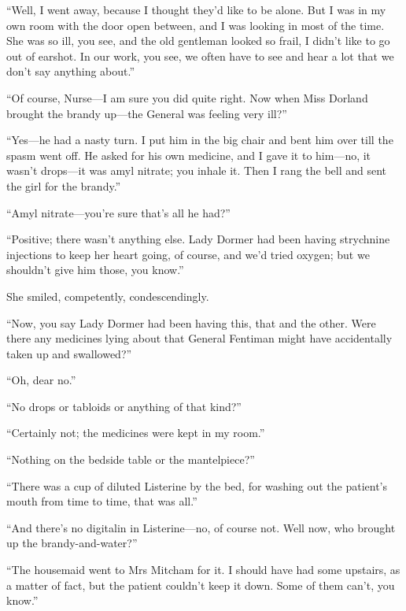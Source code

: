 \enquote{Well, I went away, because I thought they'd like to be alone. But I was in my own room with the door open between, and I was looking in most of the time. She was so ill, you see, and the old gentleman looked so frail, I didn't like to go out of earshot. In our work, you see, we often have to see and hear a lot that we don't say anything about.}

\enquote{Of course, Nurse\allowbreak---\allowbreak I am sure you did quite right. Now when Miss Dorland brought the brandy up\allowbreak---\allowbreak the General was feeling very ill?}

\enquote{Yes\allowbreak---\allowbreak he had a nasty turn. I put him in the big chair and bent him over till the spasm went off. He asked for his own medicine, and I gave it to him\allowbreak---\allowbreak no, it wasn't drops\allowbreak---\allowbreak it was amyl nitrate; you inhale it. Then I rang the bell and sent the girl for the brandy.}

\enquote{Amyl nitrate\allowbreak---\allowbreak you're sure that's all he had?}

\enquote{Positive; there wasn't anything else. Lady Dormer had been having strychnine injections to keep her heart going, of course, and we'd tried oxygen; but we shouldn't give him those, you know.}

She smiled, competently, condescendingly.

\enquote{Now, you say Lady Dormer had been having this, that and the other. Were there any medicines lying about that General Fentiman might have accidentally taken up and swallowed?}

\enquote{Oh, dear no.}

\enquote{No drops or tabloids or anything of that kind?}

\enquote{Certainly not; the medicines were kept in my room.}

\enquote{Nothing on the bedside table or the mantelpiece?}

\enquote{There was a cup of diluted Listerine by the bed, for washing out the patient's mouth from time to time, that was all.}

\enquote{And there's no digitalin in Listerine\allowbreak---\allowbreak no, of course not. Well now, who brought up the brandy-and-water?}

\enquote{The housemaid went to Mrs Mitcham for it. I should have had some upstairs, as a matter of fact, but the patient couldn't keep it down. Some of them can't, you know.}


